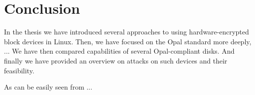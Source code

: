

















\chapter{Conclusion}

In the thesis we have introduced several approaches to using hardware-encrypted block devices in Linux. Then, we have focused on the Opal standard more deeply, ... We have then compared capabilities of several Opal-compliant disks. And finally we have provided an overview on attacks on such devices and their feasibility.

As can be easily seen from ...






\newpage

\printbibliography[heading=bibintoc] %



